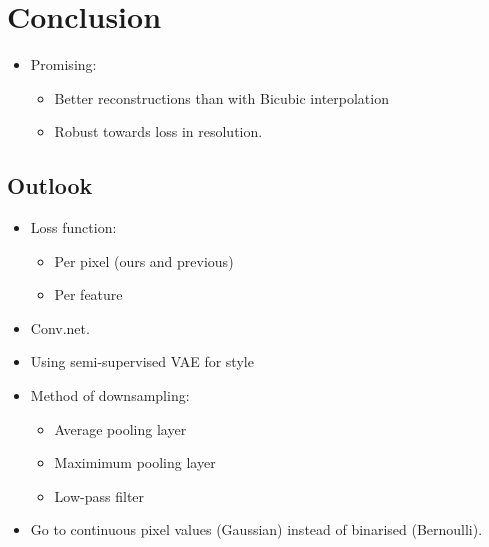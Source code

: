 \section{Conclusion} \label{sec:conclusion}

\begin{itemize}
	\item Promising:
	\begin{itemize}
		\item Better reconstructions than with Bicubic interpolation
		\item Robust towards loss in resolution.
	\end{itemize}
\end{itemize}
	
\subsection{Outlook}
\label{sub:outlook}

\begin{itemize}
	\item Loss function:
	\begin{itemize}
		\item Per pixel (ours and previous)
		\item Per feature \cite{Johnson16}
	\end{itemize}
	
	\item Conv.net.
	
	\item Using semi-supervised VAE for style \cite{Kingma2014}
	
	\item Method of downsampling:
	\begin{itemize}
		\item Average pooling layer
		\item Maximimum pooling layer
		\item Low-pass filter
	\end{itemize}
	
	\item Go to continuous pixel values (Gaussian) instead of binarised (Bernoulli).
\end{itemize}
